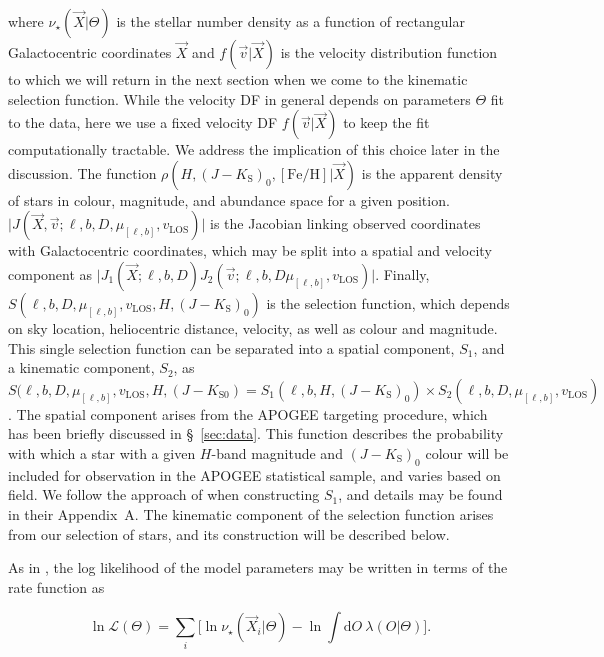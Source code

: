 \noindent where $\nu_{\star}(\vec{X} \vert \Theta)$ is the stellar number density as a function of rectangular Galactocentric coordinates $\vec{X}$ and $f(\vec{v} \vert \vec{X})$ is the velocity distribution function to which we will return in the next section when we come to the kinematic selection function. While the velocity DF in general depends on parameters $\Theta$ fit to the data, here we use a fixed velocity DF $f(\vec{v}\vert \vec{X})$ to keep the fit computationally tractable. We address the implication of this choice later in the discussion. The function $\rho(H, (J-K_\mathrm{S})_{0}, [\mathrm{Fe/H}] \vert \vec{X})$ is the apparent density of stars in colour, magnitude, and abundance space for a given position. $\vert J(\vec{X}, \vec{v}; \ell, b, D, \mu_{[\ell,b]}, v_\mathrm{LOS}) \vert$ is the Jacobian linking observed coordinates with Galactocentric coordinates, which may be split into a spatial and velocity component as $\vert J_{1}(\vec{X}; \ell, b, D) J_{2}( \vec{v}; \ell, b, D \mu_{[\ell,b]}, v_\mathrm{LOS}) \vert$. Finally, $S(\ell, b, D, \mu_{[\ell,b]}, v_\mathrm{LOS}, H, (J-K_\mathrm{S})_{0})$ is the selection function, which depends on sky location, heliocentric distance, velocity, as well as colour and magnitude. This single selection function can be separated into a spatial component, $S_{1}$, and a kinematic component, $S_{2}$, as $S(\ell, b, D, \mu_{[\ell,b]}, v_\mathrm{LOS}, H, (J-K_{\mathrm{S}0}) = S_{1}(\ell, b, H, (J-K_\mathrm{S})_{0}) \times S_{2}(\ell, b, D, \mu_{[\ell,b]}, v_\mathrm{LOS})$. The spatial component arises from the APOGEE targeting procedure, which has been briefly discussed in \S~\ref{sec:data}. This function describes the probability with which a star with a given $H$-band magnitude and $(J-K_\mathrm{S})_{0}$ colour will be included for observation in the APOGEE statistical sample, and varies based on field. We follow the approach of \cite{mackereth20} when constructing $S_{1}$, and details may be found in their Appendix~A. The kinematic component of the selection function arises from our selection of \gse stars, and its construction will be described below.

As in \textcite{bovy12}, the log likelihood of the model parameters may be written in terms of the rate function as

\begin{equation}
\label{eq:log-likelihood}
	\ln \mathcal{L}(\Theta) = \sum_{i} \big[ \ln \nu_{\star}(\vec{X}_{i} \vert \Theta) - \ln \int \mathrm{d}O\ \lambda(O \vert \Theta) \big].
\end{equation}

